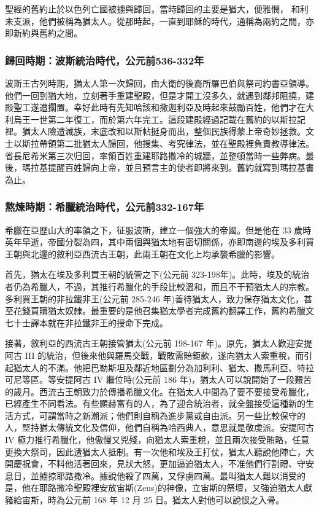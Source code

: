 聖經的舊約止於以色列亡國被擄與歸回，當時歸回的主要是猶大，便雅憫，
和利未支派，他們被稱為猶太人。從那時起，一直到耶穌的時代，通稱為兩約之間，亦即新約與舊約之間。

\subsubsection{歸回時期：波斯統治時代，公元前536-332年}
波斯王古列時期，猶太人第一次歸回，由大衛的後裔所羅巴伯與祭司約書亞領導。他們一回到猶大地，立刻著手重建聖殿，但是才開工沒多久，就遇到鄰邦阻撓，建殿聖工遂遭擱置。幸好此時有先知哈該和撒迦利亞及時起來鼓勵百姓，他們才在大利烏王一世第二年復工，而於第六年完工。這段建殿經過記載在舊約的以斯拉記裡。猶太人險遭滅族，末底改和以斯帖挺身而出，整個民族得蒙上帝奇妙拯救。文士以斯拉帶領第二批猶太人歸回，他搜集、考究律法，並在聖殿裡負責教導律法。省長尼希米第三次归回，率領百姓重建耶路撒冷的城牆，並整頓當時一些弊病。最後，瑪拉基提醒百姓歸向上帝，並且預言主的使者即將來到。舊約就寫到瑪拉基書為止。

\subsubsection{熬煉時期：希臘統治時代，公元前332-167年}
希臘在亞歷山大的率領之下，征服波斯，建立一個強大的帝國。但是他在 33 歲時英年早逝，帝國分裂為四，其中兩個與猶太地有密切關係，亦即南邊的埃及多利買王朝與北邊的敘利亞西流古王朝，此兩王朝在文化上均承襲希臘的影響。

首先，猶太在埃及多利買王朝的統管之下(公元前 323-198年)。此時，埃及的統治者仍為希臘人，不過，其推行希臘化的手段比較溫和，而且不干預猶太人的宗教。多利買王朝的非拉鐵非王(公元前 285-246 年)善待猶太人，致力保存猶太文化，甚至花錢買贖猶太奴隸。最重要的是他召集猶太學者完成舊約翻譯工作，舊約希臘文七十士譯本就在非拉鐵非王的授命下完成。

接著，敘利亞的西流古王朝接管猶太(公元前 198-167 年)。原先，猶太人歡迎安提阿古 III 的統治，但後來他與羅馬交戰，戰敗需賠鉅款，遂向猶太人索重稅，而引起猶太人的不滿。他把巴勒斯坦及鄰近地區劃分為加利利、猶太、撒馬利亞、特拉可尼等區。等安提阿古 IV 繼位時(公元前 186 年)，猶太人可以說開始了一段艱苦的歲月。西流古王朝致力於傳播希臘文化。在猶太人中間為了要不要接受希臘化，已經產生不同看法。有些顯赫富有的人，為了迎合統治者，就全盤接受這種新的生活方式，可謂當時之新潮派；他們則自稱為進步黨或自由派。另一些比較保守的人，堅持猶太傳統文化及信仰，他們自稱為哈西典人，意思就是敬虔派。安提阿古 IV 極力推行希臘化，他傲慢又兇殘，向猶太人索重稅，並且兩次接受賄賂，任意更換大祭司，因此遭猶太人抵制。有一次他和埃及王打仗，猶太人聽說他陣亡，大開慶祝會，不料他活著回來，見狀大怒，更加逼迫猶太人，不准他們行割禮、守安息日，並擄掠耶路撒冷。據說他殺了四萬，又俘虜四萬。最叫猶太人難以消受的是，他在耶路撒冷聖殿裡安放宙斯(Zeus)的神像，立宙斯的祭壇，又強迫猶太人獻豬給宙斯，時為公元前 168 年 12 月 25 日。猶太人對他可以說恨之入骨。

